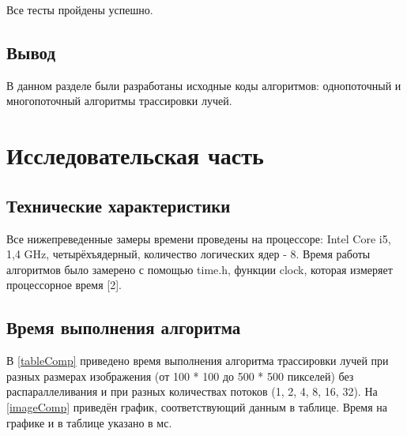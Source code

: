 \documentclass[12pt]{report}
\begin{document}
Все тесты пройдены успешно.
\newpage
\section{Вывод}

В данном разделе были разработаны исходные коды алгоритмов: однопоточный и многопоточный алгоритмы трассировки лучей.

\chapter{Исследовательская часть}

\section{Технические характеристики}

Все нижепреведенные замеры времени проведены на процессоре: Intel Core i5, 1,4 GHz, четырёхъядерный, количество логических ядер - 8. Время работы алгоритмов было замерено с помощью time.h, функции clock, которая измеряет процессорное время [2].


\section{Время выполнения алгоритма}
В \ref{tableComp} приведено время выполнения алгоритма трассировки лучей при разных размерах изображения (от 100 * 100 до 500 * 500 пикселей) без распараллеливания и при разных количествах потоков (1, 2, 4, 8, 16, 32). На \ref{imageComp} приведён график, соответствующий данным в таблице. Время на графике и в таблице указано в мс.
\end{document}
